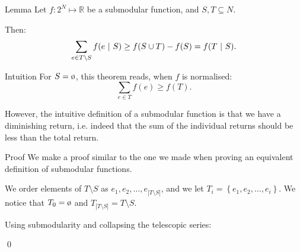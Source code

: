 \documentclass[a4paper]{article}
\begin{document}
\begin{parag}{Lemma}
    Let $f: 2^N \mapsto \mathbb{R}$ be a submodular function, and $S, T \subseteq N$.

    Then: 
    \[\sum_{e \in T \setminus S} f\left(e \suchthat S\right) \geq f\left(S \cup T\right) - f\left(S\right) = f\left(T \suchthat S\right).\]
    
    \begin{subparag}{Intuition}
        For $S = \o$, this theorem reads, when $f$ is normalised: 
        \[\sum_{e \in T} f\left(e\right) \geq f\left(T\right).\]
        
        However, the intuitive definition of a submodular function is that we have a diminishing return, i.e. indeed that the sum of the individual returns should be less than the total return. 
    \end{subparag}

    \begin{subparag}{Proof}
        We make a proof similar to the one we made when proving an equivalent definition of submodular functions.

        We order elements of $T \setminus S$ as $e_1, e_2, \ldots, e_{\left|T \setminus S\right|}$, and we let $T_i = \left\{e_1, e_2, \ldots, e_i\right\}$. We notice that $T_0 = \o$ and $T_{\left|T \setminus S\right|} = T \setminus S$. 

        Using submodularity and collapsing the telescopic series: 
        
        \qed
    \end{subparag}
\end{parag}
\end{document}
